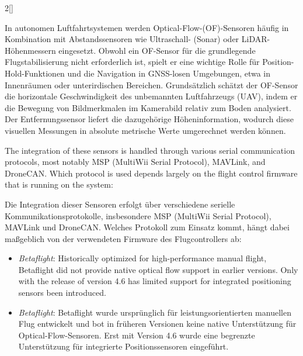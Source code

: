 \begin{paracol}{2}[]
\colger

In autonomen Luftfahrtsystemen werden Optical-Flow-(OF)-Sensoren häufig in Kombination mit Abstandssensoren wie Ultraschall- (Sonar) oder LiDAR-Höhenmessern eingesetzt. Obwohl ein OF-Sensor für die grundlegende Flugstabilisierung nicht erforderlich ist, spielt er eine wichtige Rolle für Position-Hold-Funktionen und die Navigation in GNSS-losen Umgebungen, etwa in Innenräumen oder unterirdischen Bereichen. Grundsätzlich schätzt der OF-Sensor die horizontale Geschwindigkeit des unbemannten Luftfahrzeugs (UAV), indem er die Bewegung von Bildmerkmalen im Kamerabild relativ zum Boden analysiert. Der Entfernungssensor liefert die dazugehörige Höheninformation, wodurch diese visuellen Messungen in absolute metrische Werte umgerechnet werden können.

\coleng

The integration of these sensors is handled through various serial communication protocols, most notably MSP (MultiWii Serial Protocol), MAVLink, and DroneCAN. Which protocol is used depends largely on the flight control firmware that is running on the system:

\colger

Die Integration dieser Sensoren erfolgt über verschiedene serielle Kommunikationsprotokolle, insbesondere MSP (MultiWii Serial Protocol), MAVLink und DroneCAN. Welches Protokoll zum Einsatz kommt, hängt dabei maßgeblich von der verwendeten Firmware des Flugcontrollers ab:

\coleng

\begin{itemize}
\item \textsl{Betaflight}: Historically optimized for high-performance manual flight, Betaflight did not provide native optical flow support in earlier versions. Only with the release of version 4.6 has limited support for integrated positioning sensors been introduced.
\end{itemize}

\colger

\begin{itemize}
\item \textsl{Betaflight}: Betaflight wurde ursprünglich für leistungsorientierten manuellen Flug entwickelt und bot in früheren Versionen keine native Unterstützung für Optical-Flow-Sensoren. Erst mit Version 4.6 wurde eine begrenzte Unterstützung für integrierte Positionssensoren eingeführt.
\end{itemize}



\end{paracol}
